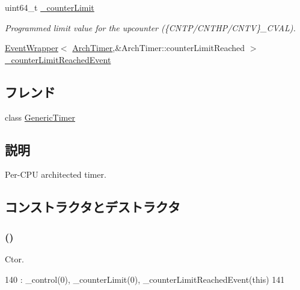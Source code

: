 \begin{DoxyCompactItemize}
uint64\_\-t \hyperlink{classGenericTimer_1_1ArchTimer_aabfe56278c393b1a362bf291f2d5fa1b}{\_\-counterLimit}
\begin{DoxyCompactList}\small\item\em Programmed limit value for the upcounter (\{CNTP/CNTHP/CNTV\}\_\-CVAL). \item\end{DoxyCompactList}\item 
\hyperlink{classEventWrapper}{EventWrapper}$<$ \hyperlink{classGenericTimer_1_1ArchTimer}{ArchTimer},\&ArchTimer::counterLimitReached $>$ \hyperlink{classGenericTimer_1_1ArchTimer_af3d9b927e7a4e847638d2703b3e9053c}{\_\-counterLimitReachedEvent}
\end{DoxyCompactItemize}
\subsection*{フレンド}
\begin{DoxyCompactItemize}
\item 
class \hyperlink{classGenericTimer_1_1ArchTimer_a2ee40beffc6dffc416498927895820e7}{GenericTimer}
\end{DoxyCompactItemize}


\subsection{説明}
Per-\/CPU architected timer. 

\subsection{コンストラクタとデストラクタ}
\hypertarget{classGenericTimer_1_1ArchTimer_a8b96adab98c203cf9238b92cd1376ef5}{
\subsubsection[{ArchTimer}]{ ()}}
\label{classGenericTimer_1_1ArchTimer_a8b96adab98c203cf9238b92cd1376ef5}


Ctor. 


\begin{DoxyCode}
140             : _control(0), _counterLimit(0), _counterLimitReachedEvent(this)
141         {}
\end{DoxyCode}


